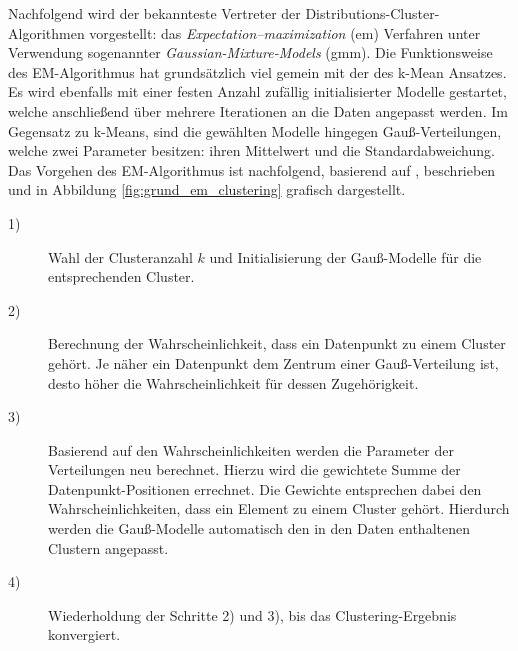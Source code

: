 Nachfolgend wird der bekannteste Vertreter der Distributions-Cluster-Algorithmen vorgestellt:
das \textit{Expectation–maximization} (\acrshort*{em}) Verfahren unter Verwendung sogenannter \textit{Gaussian-Mixture-Models} (\acrshort*{gmm}).
Die Funktionsweise des EM-Algorithmus hat grundsätzlich viel gemein mit der des k-Mean Ansatzes.
Es wird ebenfalls mit einer festen Anzahl zufällig initialisierter Modelle gestartet, welche anschließend über mehrere Iterationen
an die Daten angepasst werden. Im Gegensatz zu k-Means, sind die gewählten Modelle hingegen Gauß-Verteilungen,
welche zwei Parameter besitzen: ihren Mittelwert und die Standardabweichung.
Das Vorgehen des EM-Algorithmus ist nachfolgend, basierend auf \cite[]{GeorgeSeif2018}, beschrieben und in
Abbildung \ref{fig:grund_em_clustering} grafisch dargestellt.

\begin{description}
    \item[1)] Wahl der Clusteranzahl $k$ und Initialisierung der Gauß-Modelle für die entsprechenden Cluster.
    \item[2)] Berechnung der Wahrscheinlichkeit, dass ein Datenpunkt zu einem Cluster gehört. Je näher
              ein Datenpunkt dem Zentrum einer Gauß-Verteilung ist, desto höher die Wahrscheinlichkeit für dessen Zugehörigkeit.
    \item[3)] Basierend auf den Wahrscheinlichkeiten werden die Parameter der Verteilungen neu berechnet.
              Hierzu wird die gewichtete Summe der Datenpunkt-Positionen errechnet. Die Gewichte entsprechen dabei
              den Wahrscheinlichkeiten, dass ein Element zu einem Cluster gehört. Hierdurch werden die Gauß-Modelle automatisch
              den in den Daten enthaltenen Clustern angepasst.
    \item[4)] Wiederholdung der Schritte 2) und 3), bis das Clustering-Ergebnis konvergiert.
\end{description}

